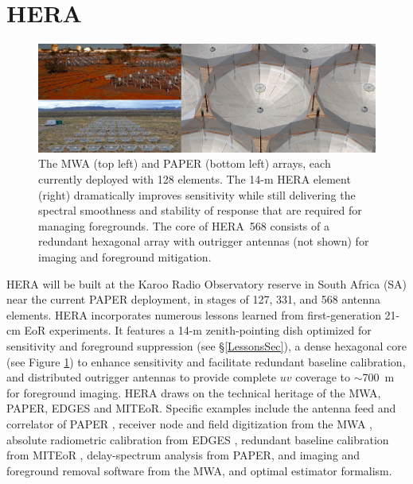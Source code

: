 \documentclass[preprint]{aastex}
\begin{document}

\vspace{-0.25in}
\section{HERA}
\label{PDsec}
\begin{figure}[t]\centering
\includegraphics[width=6.5in]{plots/PAPER_and_MWA_and_HERA.jpg}
\caption{\small
The MWA (top left) and PAPER (bottom left) arrays, each currently deployed with 128 elements.
The 14-m HERA element (right) dramatically improves sensitivity
while still delivering the spectral smoothness and stability of response that
are required for managing foregrounds.
The core of HERA~568 consists of a redundant hexagonal array with
outrigger antennas (not shown) for imaging and foreground mitigation.
}
\label{HERAfig}
\end{figure}

HERA will be built at the Karoo Radio Observatory reserve in South Africa (SA) near the
current PAPER deployment, in stages of 127, 331, and 568 antenna elements.
HERA 
incorporates numerous lessons learned from first-generation 21-cm EoR experiments.
It features a 14-m zenith-pointing dish optimized for sensitivity and foreground suppression 
(see \S\ref{LessonsSec}),
a dense hexagonal core (see Figure \ref{HERAfig}) to enhance sensitivity and facilitate 
redundant baseline calibration,
and distributed outrigger antennas to provide
complete $uv$ coverage to $\sim$700~m for foreground imaging.
HERA draws on the technical heritage of the MWA, PAPER,
EDGES and MITEoR. Specific examples include the antenna feed and correlator of
PAPER \citep{bradley_et_al2005}, receiver node and field digitization 
from the MWA \citep{lonsdale_et_al2009_trunc,tingay_et_al2013_trunc}, absolute radiometric
calibration from EDGES \citep{rogers_2012}, redundant baseline calibration 
from MITEoR \citep{zheng_et_al2013_trunc}, 
delay-spectrum analysis from PAPER, and imaging and foreground
removal software from the MWA, and optimal estimator formalism.
\end{document}
